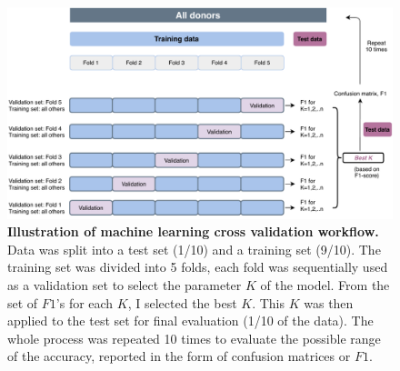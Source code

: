 \begin{figure}[ht!]
    \centering
    \includegraphics[scale=0.78]{graphics/ML_demo.pdf}
    \caption{\textbf{Illustration of machine learning cross validation workflow.} Data was split into a test set (1/10) and a training set (9/10). The training set was divided into 5 folds, each fold was sequentially used as a validation set to select the parameter $K$ of the model. From the set of $F1$'s for each $K$, I selected the best $K$. This $K$ was then applied to the test set for final evaluation (1/10 of the data). The whole process was repeated 10 times to evaluate the possible range of the accuracy, reported in the form of confusion matrices or $F1$.}
    \label{fig:cv_demo}
\end{figure}
